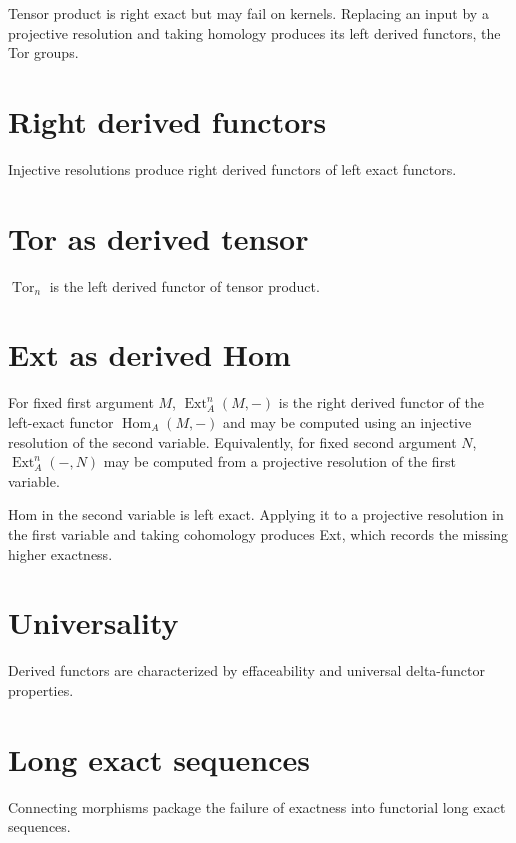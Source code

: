 \begin{example}\label{ex:v28-expand-01}
Tensor product is right exact but may fail on kernels. Replacing an input by a projective resolution and taking homology produces its left derived functors, the Tor groups.
\end{example}
\section{Right derived functors}
Injective resolutions produce right derived functors of left exact functors.

\section{Tor as derived tensor}
$\operatorname{Tor}_n$ is the left derived functor of tensor product.

\section{Ext as derived Hom}
For fixed first argument \(M\), \(\operatorname{Ext}_A^n(M,-)\) is the right derived functor of the left-exact functor \(\operatorname{Hom}_A(M,-)\) and may be computed using an injective resolution of the second variable. Equivalently, for fixed second argument \(N\), \(\operatorname{Ext}_A^n(-,N)\) may be computed from a projective resolution of the first variable.

\begin{example}\label{ex:v28-expand-02}
Hom in the second variable is left exact. Applying it to a projective resolution in the first variable and taking cohomology produces Ext, which records the missing higher exactness.
\end{example}
\section{Universality}
Derived functors are characterized by effaceability and universal delta-functor properties.

\section{Long exact sequences}
Connecting morphisms package the failure of exactness into functorial long exact sequences.


